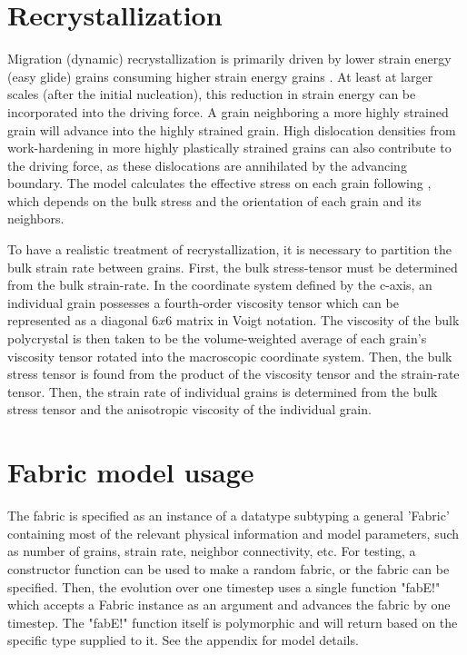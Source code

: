 \documentclass{article}
\begin{document}
\section{Recrystallization}
Migration (dynamic) recrystallization is primarily driven by lower strain energy (easy glide) grains consuming higher strain energy grains \citep{duval1995}. At least at larger scales (after the initial nucleation), this reduction in strain energy can be incorporated into the driving force. A grain neighboring a more highly strained grain will advance into the highly strained grain. High dislocation densities from work-hardening in more highly plastically strained grains can also contribute to the driving force, as these dislocations are annihilated by the advancing boundary. The model calculates the effective stress on each grain following \citet{azuma96}, which depends on the bulk stress and the orientation of each grain and its neighbors.

To have a realistic treatment of recrystallization, it is necessary to partition the bulk strain rate between grains. First, the bulk stress-tensor must be determined from the bulk strain-rate. In the coordinate system defined by the c-axis, an individual grain possesses a fourth-order viscosity tensor which can be represented as a diagonal $6x6$ matrix in Voigt notation. The viscosity of the bulk polycrystal is then taken to be the volume-weighted average of each grain's viscosity tensor rotated into the macroscopic coordinate system. Then, the bulk stress tensor is found from the product of the viscosity tensor and the strain-rate tensor. Then, the strain rate of individual grains is determined from the bulk stress tensor and the anisotropic viscosity of the individual grain.

\section{Fabric model usage}
The fabric is specified as an instance of a datatype subtyping a general 'Fabric' containing most of the relevant physical information and model parameters, such as number of grains, strain rate, neighbor connectivity, etc. For testing, a constructor function can be used to make a random fabric, or the fabric can be specified. Then, the evolution over one timestep uses a single function "fabE!" which accepts a Fabric instance as an argument and advances the fabric by one timestep. The "fabE!" function itself is polymorphic and will return based on the specific type supplied to it. See the appendix for model details.
\end{document}
